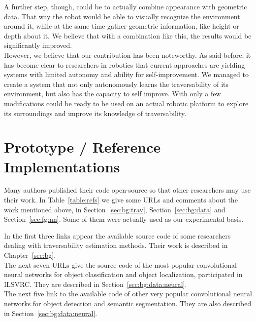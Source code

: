 \documentclass[12pt,a4paper,table,dvipsnames,tikz]{report}
\newcommand{\acronym}{\MakeUppercase}
\newcommand{\bl}[1]{{\hypersetup{linkcolor=blue}#1}}
\begin{document}
	
	A further step, though, could be to actually combine appearance with geometric 
	data. That way the robot would be able to visually recognize the environment 
	around it, while at the same time gather geometric information, like height or 
	depth about it. We believe that with a combination like this, the results would 
	be significantly improved.
	\\
	
	However, we believe that our contribution has been noteworthy. As said before, it 
	has become clear to researchers in robotics that current approaches are yielding 
	systems with limited autonomy and ability for self-improvement. We managed to 
	create a system that not only autonomously learns the traversability of its 
	environment, but also has the capacity to self improve. With only a few modifications 
	could be ready to be used on an actual robotic platform to explore its surroundings 
	and improve its knowledge of traversability.
	
	
	
	\appendix
	\chapter{Prototype / Reference Implementations}
	\label{app:urls}
	
	Many authors published their code open-source so that other researchers may 
	use their work. In Table~\bl{\ref{table:refs}} we give some \acronym{url}s and 
	comments about the work mentioned above, in Section~\ref{sec:bg:trav}, 
	Section~\ref{sec:bg:data} and Section~\ref{sec:fg:nn}. Some of them were 
	actually used as our experimental basis.
	\\
	
	\begin{table}[h]
		\centering	
			
	\end{table}
	
	In the first three links appear the available source code of some researchers dealing 
	with traversability estimation methods. Their work is described in Chapter~\ref{sec:bg}.
	\\
	
	The next seven \acronym{url}s give the source code of the most popular convolutional 
	neural networks for object classification and object localization, participated in 
	\acronym{ilsvrc}. They are described in Section~\ref{sec:bg:data:neural}.
	\\
	
	The next five link to the available code of other very popular convolutional neural 
	networks for object detection and semantic segmentation. They are also described in 
	Section~\ref{sec:bg:data:neural}.
	\\
	
\end{document}
